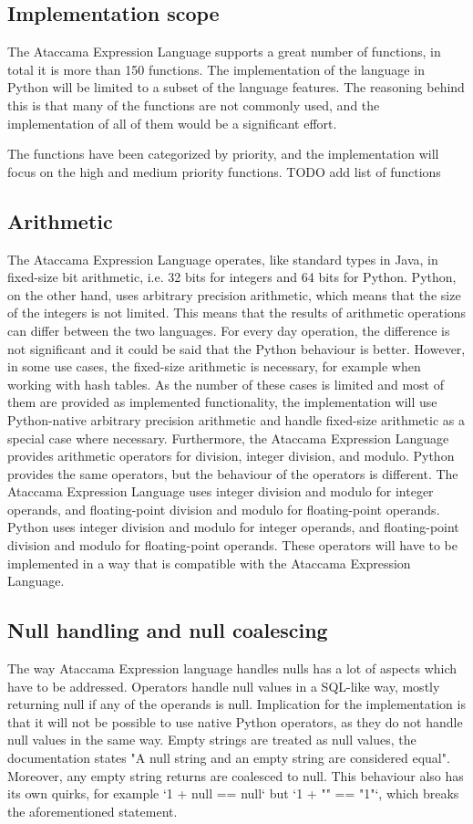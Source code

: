 \subsection{Implementation scope}

The Ataccama Expression Language supports a great number of functions, in
total it is more than 150 functions.
The implementation of the language in Python will be limited to a subset of
the language features. The reasoning behind this is that many of the functions are
not commonly used, and the implementation of all of them would be a significant
effort.

The functions have been categorized by priority, and the implementation will
focus on the high and medium priority functions.
TODO add list of functions

\subsection{Arithmetic}
The Ataccama Expression Language operates, like standard types in Java, in
fixed-size bit arithmetic, i.e. 32 bits for integers and 64 bits for Python. Python,
on the other hand, uses arbitrary precision arithmetic, which means that the size
of the integers is not limited. This means that the results of arithmetic operations
can differ between the two languages.
For every day operation, the difference is not significant and it could be said
that the Python behaviour is better. However, in some use cases, the fixed-size
arithmetic is necessary, for example when working with hash tables. As the number
of these cases is limited and most of them are provided as implemented functionality,
the implementation will use Python-native arbitrary precision arithmetic and
handle fixed-size arithmetic as a special case where necessary.
Furthermore, the Ataccama Expression Language provides arithmetic operators
for division, integer division, and modulo. Python provides the same operators, but
the behaviour of the operators is different. The Ataccama Expression Language
uses integer division and modulo for integer operands, and floating-point division
and modulo for floating-point operands. Python uses integer division and modulo
for integer operands, and floating-point division and modulo for floating-point
operands. These operators will have to be implemented in a way that is compatible
with the Ataccama Expression Language.
\subsection{Null handling and null coalescing}
The way Ataccama Expression language handles nulls has a lot of aspects
which have to be addressed.
Operators handle null values in a SQL-like way, mostly returning null if any
of the operands is null. Implication for the implementation is that it will not be
possible to use native Python operators, as they do not handle null values in the
same way.
Empty strings are treated as null values, the documentation states "A null
string and an empty string are considered equal". Moreover, any empty string
returns are coalesced to null. This behaviour also has its own quirks, for example
‘1 + null == null‘ but ‘1 + "" == "1"‘, which breaks the aforementioned statement.

